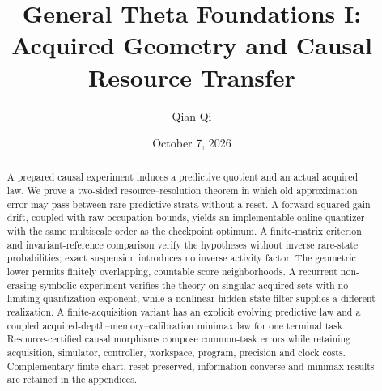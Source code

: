 \documentclass[11pt]{amsart}
\title[Acquired geometry and causal resource transfer]{General Theta Foundations I:\\Acquired Geometry and Causal Resource Transfer}
\author{Qian Qi}
\date{October 7, 2026}
\theoremstyle{definition}
\begin{document}
\begin{abstract}
A prepared causal experiment induces a predictive quotient and an actual acquired law. We prove a two-sided resource--resolution theorem in which old approximation error may pass between rare predictive strata without a reset. A forward squared-gain drift, coupled with raw occupation bounds, yields an implementable online quantizer with the same multiscale order as the checkpoint optimum. A finite-matrix criterion and invariant-reference comparison verify the hypotheses without inverse rare-state probabilities; exact suspension introduces no inverse activity factor. The geometric lower permits finitely overlapping, countable score neighborhoods. A recurrent non-erasing symbolic experiment verifies the theory on singular acquired sets with no limiting quantization exponent, while a nonlinear hidden-state filter supplies a different realization. A finite-acquisition variant has an explicit evolving predictive law and a coupled acquired-depth--memory--calibration minimax law for one terminal task. Resource-certified causal morphisms compose common-task errors while retaining acquisition, simulator, controller, workspace, program, precision and clock costs. Complementary finite-chart, reset-preserved, information-converse and minimax results are retained in the appendices.
\end{abstract}
\maketitle







\appendix









\clearpage

\end{document}
